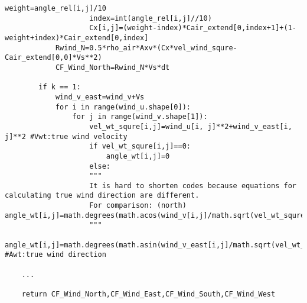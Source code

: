\begin{lstlisting}[caption=Function for calculating cost caused by wind (parts of code)(\autoref{Cost Wind}), label=calcostwind]
                    weight=angle_rel[i,j]/10
                    index=int(angle_rel[i,j]//10)
                    Cx[i,j]=(weight-index)*Cair_extend[0,index+1]+(1-weight+index)*Cair_extend[0,index]
            Rwind_N=0.5*rho_air*Axv*(Cx*vel_wind_squre-Cair_extend[0,0]*Vs**2)
            CF_Wind_North=Rwind_N*Vs*dt

        if k == 1:
            wind_v_east=wind_v+Vs
            for i in range(wind_u.shape[0]):
                for j in range(wind_v.shape[1]):
                    vel_wt_squre[i,j]=wind_u[i, j]**2+wind_v_east[i, j]**2 #Vwt:true wind velocity
                    if vel_wt_squre[i,j]==0:
                        angle_wt[i,j]=0
                    else:
                    """                     
                    It is hard to shorten codes because equations for calculating true wind direction are different.
                    For comparison: (north) angle_wt[i,j]=math.degrees(math.acos(wind_v[i,j]/math.sqrt(vel_wt_squre[i,j])))
                    """
                        angle_wt[i,j]=math.degrees(math.asin(wind_v_east[i,j]/math.sqrt(vel_wt_squre[i,j]))) #Awt:true wind direction
        
    ...

    return CF_Wind_North,CF_Wind_East,CF_Wind_South,CF_Wind_West
\end{lstlisting}
